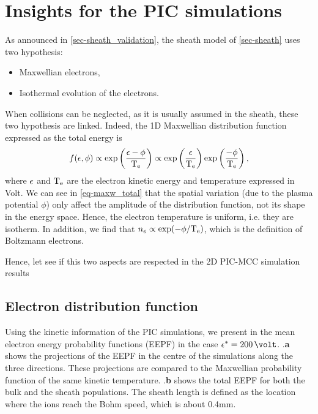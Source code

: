 


\section{Insights for the PIC simulations}
\label{sec-insights}

As announced in \vref{sec-sheath_validation}, the sheath model of \vref{sec-sheath} uses two hypothesis\string:
\begin{itemize}
  \item Maxwellian electrons,
  \item Isothermal evolution of the electrons.
\end{itemize}

When collisions can be neglected, as it is usually assumed in the sheath, these two hypothesis are linked.
Indeed, the \ac{1D} Maxwellian distribution function expressed as the total energy is
\begin{equation} \label{eq-maxw_total}
  f(\epsilon, \phi) \propto \exp \left( \frac{\epsilon - \phi}{\mathrm{T_e}}  \right)  \propto \exp \left( \frac{\epsilon}{\mathrm{T_e}} \right) \exp \left( \frac{-\phi}{\mathrm{T_e}} \right),
\end{equation}
where $\epsilon$ and $\mathrm{T_e}$ are the electron kinetic energy and temperature expressed in Volt.
We can see in \cref{eq-maxw_total} that the spatial variation (due to the plasma potential $\phi$) only affect the amplitude of the distribution function, not its shape in the energy space.
Hence, the electron temperature is uniform, i.e. they are isotherm.
In addition, we find that $n_e \propto \exp (- \phi / \mathrm{T_e})$, which is the definition of Boltzmann electrons.

Hence, let see if this two aspects are respected in the \ac{2D} \ac{PIC}-\ac{MCC} simulation results

\subsection{Electron distribution function}
\label{subsec-eedf_2D}

Using the kinetic information of the PIC simulations, we present in  the mean electron energy probability functions (EEPF) in the case $\crover = 200\,\volt$.
.{\bf a} shows the projections of the EEPF in the centre of the simulations along the three directions.
These projections are compared to the Maxwellian probability function of the same
kinetic temperature.
.{\bf b} shows the total EEPF for both the bulk and the sheath populations.
 The sheath length is defined as the location where the ions reach the Bohm speed, which is about 0.4mm.
 
